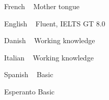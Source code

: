

\begin{cvskills}

  \cvskill
    {French ~ \emojiflagfr} %
    {Mother tongue} %

  \cvskill
    {English ~ \emojiflagus} %
    {Fluent, IELTS GT 8.0} %

  \cvskill
    {Danish ~ \emojiflagdk} %
    {Working knowledge} %

  \cvskill
    {Italian ~ \emojiflagit} %
    {Working knowledge} %

  \cvskill
    {Spanish ~ \emojiflages} %
    {Basic} %

  \cvskill
    {Esperanto} %
    {Basic} %

\end{cvskills}
